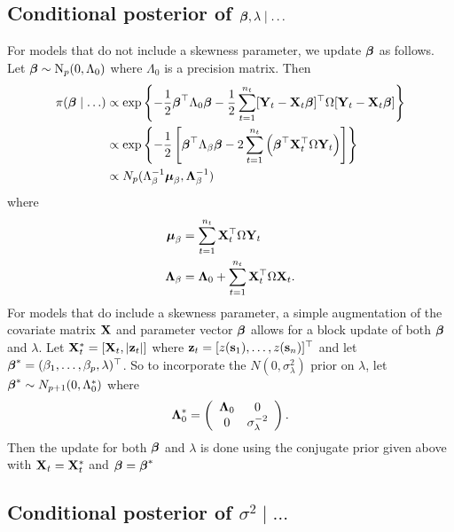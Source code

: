 \subsection*{Conditional posterior of $\mbox{\boldmath $\beta$}, \lambda \mid \ldots$} \label{sts:betapost}

For models that do not include a skewness parameter, we update $\mbox{\boldmath $\beta$}$ as follows.
Let $\mbox{\boldmath $\beta$} \sim \mbox{N}_{p}(0, \Lambda_0)$ where $\Lambda_0$ is a precision matrix.
Then
\begin{align*}
    \pi(\mbox{\boldmath $\beta$} \mid \ldots) & \propto \exp \left\{ - \frac{ 1 }{ 2 } \mbox{\boldmath $\beta$}^\top \Lambda_0 \mbox{\boldmath $\beta$} - \frac{ 1 }{ 2 } \sum_{t = 1}^{n_t} [\mathbf{Y}_t -\mathbf{X}_t \mbox{\boldmath $\beta$}]^\top \Omega [\mathbf{Y}_t - \mathbf{X}_t \mbox{\boldmath $\beta$}] \right\} \\
     & \propto \exp \left\{ -\frac{ 1 }{ 2 } \left[ \mbox{\boldmath $\beta$}^\top \Lambda_\beta \mbox{\boldmath $\beta$}  - 2 \sum_{t = 1}^{n_t} \left(\mbox{\boldmath $\beta$}^\top \mathbf{X}_t^\top \Omega \mathbf{Y}_t \right) \right] \right\} \\
     & \propto N_p ( \Lambda_\beta^{-1} \mbox{\boldmath $\mu$}_\beta , \mbox{\boldmath $\Lambda$}_\beta^{-1})
\end{align*}
where
\begin{align*}
    \mbox{\boldmath $\mu$}_\beta &= \sum_{t = 1}^{n_t} \mathbf{X}_t^\top \Omega \mathbf{Y}_t \\
    \mbox{\boldmath $\Lambda$}_\beta &= \mbox{\boldmath $\Lambda$}_0 + \sum_{t = 1}^{n_t} \mathbf{X}_t^\top \Omega \mathbf{X}_t.
\end{align*}
For models that do include a skewness parameter, a simple augmentation of the covariate matrix $\mathbf{X}$ and parameter vector $\mbox{\boldmath $\beta$}$ allows for a block update of both $\mbox{\boldmath $\beta$}$ and $\lambda$.
Let $\mathbf{X}^*_{t} = [\mathbf{X}_t, |\mathbf{z}_{t}|]$ where $\mathbf{z}_t = [z(\mathbf{s}_1), \ldots, z(\mathbf{s}_{n})]^\top$ and let $\mbox{\boldmath $\beta$}^* = (\beta_1, \ldots, \beta_p, \lambda)^\top$.
So to incorporate the $N(0, \sigma^2_\lambda)$ prior on $\lambda$, let $\mbox{\boldmath $\beta$}^* \sim N_{p+1}(0, \Lambda^*_0)$ where
\begin{align*}
  \mbox{\boldmath $\Lambda$}^*_0 = \left( \begin{array}{cc}
    \mbox{\boldmath $\Lambda$}_0 & 0 \\
    0         & \sigma^{-2}_\lambda
  \end{array}\right).
\end{align*}
Then the update for both $\mbox{\boldmath $\beta$}$ and $\lambda$ is done using the conjugate prior given above with $\mathbf{X}_t = \mathbf{X}_t^*$ and $\mbox{\boldmath $\beta$} = \mbox{\boldmath $\beta$}^*$

\subsection*{Conditional posterior of $\sigma^2 \mid \ldots$} \label{sts:sigpost}

